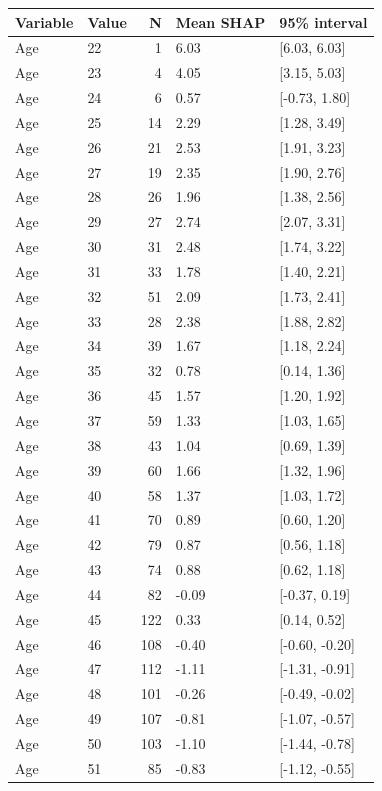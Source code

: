 \begin{tabular}{llrll}
\toprule
Variable & Value & N & Mean SHAP & 95\% interval\\
\midrule
Age & 22 & 1 & 6.03 & {}[6.03, 6.03]\\
Age & 23 & 4 & 4.05 & {}[3.15, 5.03]\\
Age & 24 & 6 & 0.57 & {}[-0.73, 1.80]\\
Age & 25 & 14 & 2.29 & {}[1.28, 3.49]\\
Age & 26 & 21 & 2.53 & {}[1.91, 3.23]\\
\addlinespace
Age & 27 & 19 & 2.35 & {}[1.90, 2.76]\\
Age & 28 & 26 & 1.96 & {}[1.38, 2.56]\\
Age & 29 & 27 & 2.74 & {}[2.07, 3.31]\\
Age & 30 & 31 & 2.48 & {}[1.74, 3.22]\\
Age & 31 & 33 & 1.78 & {}[1.40, 2.21]\\
\addlinespace
Age & 32 & 51 & 2.09 & {}[1.73, 2.41]\\
Age & 33 & 28 & 2.38 & {}[1.88, 2.82]\\
Age & 34 & 39 & 1.67 & {}[1.18, 2.24]\\
Age & 35 & 32 & 0.78 & {}[0.14, 1.36]\\
Age & 36 & 45 & 1.57 & {}[1.20, 1.92]\\
\addlinespace
Age & 37 & 59 & 1.33 & {}[1.03, 1.65]\\
Age & 38 & 43 & 1.04 & {}[0.69, 1.39]\\
Age & 39 & 60 & 1.66 & {}[1.32, 1.96]\\
Age & 40 & 58 & 1.37 & {}[1.03, 1.72]\\
Age & 41 & 70 & 0.89 & {}[0.60, 1.20]\\
\addlinespace
Age & 42 & 79 & 0.87 & {}[0.56, 1.18]\\
Age & 43 & 74 & 0.88 & {}[0.62, 1.18]\\
Age & 44 & 82 & -0.09 & {}[-0.37, 0.19]\\
Age & 45 & 122 & 0.33 & {}[0.14, 0.52]\\
Age & 46 & 108 & -0.40 & {}[-0.60, -0.20]\\
\addlinespace
Age & 47 & 112 & -1.11 & {}[-1.31, -0.91]\\
Age & 48 & 101 & -0.26 & {}[-0.49, -0.02]\\
Age & 49 & 107 & -0.81 & {}[-1.07, -0.57]\\
Age & 50 & 103 & -1.10 & {}[-1.44, -0.78]\\
Age & 51 & 85 & -0.83 & {}[-1.12, -0.55]\\

\end{tabular}
